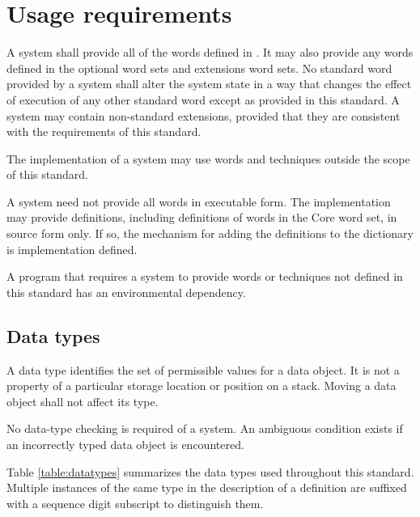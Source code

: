 \chapter{Usage requirements}
\label{usage}

A system shall provide all of the words defined in
. It may also provide any
words defined in the optional word sets and extensions word
sets. No standard word provided by a system shall alter the
system state in a way that changes the effect of execution of
any other standard word except as provided in this standard.
A system may contain non-standard extensions, provided that
they are consistent with the requirements of this standard.

The implementation of a system may use words and techniques
outside the scope of this standard.

A system need not provide all words in executable form. The
implementation may provide definitions, including definitions
of words in the Core word set, in source form only. If so,
the mechanism for adding the definitions to the dictionary
is implementation defined.

A program that requires a system to provide words or techniques
not defined in this standard has an environmental dependency.

\section{Data types} %
\label{usage:data}

A data type identifies the set of permissible values for a
data object. It is not a property of a particular storage
location or position on a stack. Moving a data object shall
not affect its type.

No data-type checking is required of a system. An ambiguous
condition exists if an incorrectly typed data object is
encountered.

Table \ref{table:datatypes} summarizes the data types used
throughout this standard. Multiple instances of the same
type in the description of a definition are suffixed with
a sequence digit subscript to distinguish them.


